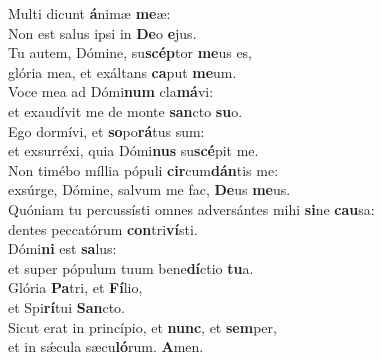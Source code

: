 \evenverse Multi dicunt \textbf{á}nimæ \textbf{me}æ:~\*\\
\evenverse Non est salus ipsi in \textbf{De}o \textbf{e}jus.\\
\oddverse Tu autem, Dómine, su\textbf{scép}tor \textbf{me}us es,~\*\\
\oddverse glória mea, et exáltans \textbf{ca}put \textbf{me}um.\\
\evenverse Voce mea ad Dómi\textbf{num} cla\textbf{má}vi:~\*\\
\evenverse et exaudívit me de monte \textbf{san}cto \textbf{su}o.\\
\oddverse Ego dormívi, et \textbf{so}po\textbf{rá}tus sum:~\*\\
\oddverse et exsurréxi, quia Dómi\textbf{nus} su\textbf{scé}pit me.\\
\evenverse Non timébo míllia pópuli \textbf{cir}cum\textbf{dán}tis me:~\*\\
\evenverse exsúrge, Dómine, salvum me fac, \textbf{De}us \textbf{me}us.\\
\oddverse Quóniam tu percussísti omnes adversántes mihi \textbf{si}ne \textbf{cau}sa:~\*\\
\oddverse dentes peccatórum \textbf{con}tri\textbf{ví}sti.\\
\evenverse Dómi\textbf{ni} est \textbf{sa}lus:~\*\\
\evenverse et super pópulum tuum bene\textbf{dí}ctio \textbf{tu}a.\\
\oddverse Glória \textbf{Pa}tri, et \textbf{Fí}lio,~\*\\
\oddverse et Spi\textbf{rí}tui \textbf{San}cto.\\
\evenverse Sicut erat in princípio, et \textbf{nunc}, et \textbf{sem}per,~\*\\
\evenverse et in sǽcula sæcu\textbf{ló}rum. \textbf{A}men.\\
